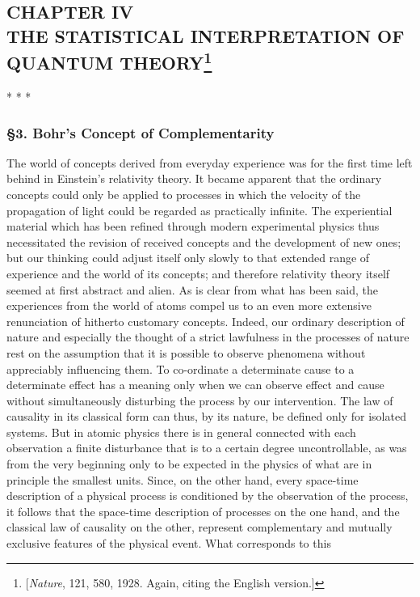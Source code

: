 \subsection*{CHAPTER IV\\ 
THE STATISTICAL INTERPRETATION OF QUANTUM THEORY\footnote{{[}\emph{Nature}, 121,
  580, 1928. Again, citing the English version.{]}}}
\centerline{* * *}

\subsubsection*{§3. Bohr's Concept of Complementarity}


The world of concepts derived from everyday experience was for the first
time left behind in Einstein's relativity theory. It became apparent
that the ordinary concepts could only be applied to processes in which
the velocity of the propagation of light could be regarded as
practically infinite. The experiential material which has been refined
through modern experimental physics thus necessitated the revision of
received concepts and the development of new ones; but our thinking
could adjust itself only slowly to that extended range of experience and
the world of its concepts; and therefore relativity theory itself
seemed at first abstract and alien. As is clear from what has been said,
the experiences from the world of atoms compel us to an even more
extensive renunciation of hitherto customary concepts. Indeed, our
ordinary description of nature and especially the thought of a strict
lawfulness in the processes of nature rest on the assumption that it is
possible to observe phenomena without appreciably influencing them. To
co-ordinate a determinate cause to a determinate effect has a meaning
only when we can observe effect and cause without simultaneously
disturbing the process by our intervention. The law of causality in its
classical form can thus, by its nature, be defined only for isolated
systems. But in atomic physics there is in general connected with each
observation a finite disturbance that is to a certain degree
uncontrollable, as was from the very beginning only to be expected in
the physics of what are in principle the smallest units. Since, on the
other hand, every space-time description of a physical process is
conditioned by the observation of the process, it follows that the
space-time description of processes on the one hand, and the classical
law of causality on the other, represent complementary and mutually
exclusive features of the physical event. What corresponds to this
